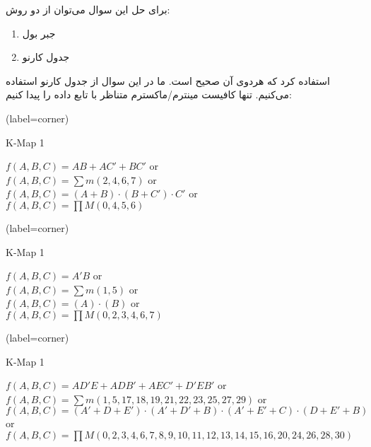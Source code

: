 
برای حل این سوال می‌توان از دو روش:
\begin{enumerate}
	\item 
	جبر بول
	\item 
	 جدول کارنو
\end{enumerate}
استفاده کرد که هردوی آن صحیح است. ما در این سوال از جدول کارنو استفاده می‌کنیم. تنها کافیست مینترم/ماکسترم متناظر با تابع داده را پیدا کنیم:



\begin{latin}
	\begin{minipage}{0.48\textwidth}
		\centering
		\begin{karnaugh-map}[4][2][1][$B$][$A$][$C$](label=corner)
		\end{karnaugh-map}
		\caption{K-Map 1}
		$f(A,B,C)=AB+AC'+BC'$ or\\
		$f(A,B,C)=\sum m(2,4,6,7)$ or\\
		$f(A,B,C)=(A+B) \cdot (B+C') \cdot C'$ or\\
		$f(A,B,C)=\prod M(0,4,5,6)$
	\end{minipage}
	\hfill
	\begin{minipage}{0.48\textwidth}
		\centering
		\begin{karnaugh-map}[4][2][1][$B$][$A$][$C$](label=corner)
		\end{karnaugh-map}
		\caption{K-Map 1}
		$f(A,B,C)=A'B$ or\\
		$f(A,B,C)=\sum m(1,5)$ or\\
		$f(A,B,C)=(A)\cdot (B)$ or\\
		$f(A,B,C)=\prod M(0,2,3,4,6,7)$
	\end{minipage}	
\end{latin}

\begin{latin}
	\centering
	\begin{karnaugh-map}[4][4][2][$C$][$B$][$E$][$D$][$A$](label=corner)
	\end{karnaugh-map}
	\caption{K-Map 1}
	$f(A,B,C)=AD'E+ADB'+AEC'+D'EB'$ or\\
	$f(A,B,C)=\sum m(1,5,17,18,19,21,22,23,25,27,29)$ or\\
	$f(A,B,C)=(A'+D+E') \cdot (A'+D'+B) \cdot (A'+E'+C) \cdot (D+E'+B) $ or\\
	$f(A,B,C)=\prod M(0,2,3,4,6,7,8,9,10,11,12,13,14,15,16,20,24,26,28,30)$
\end{latin}